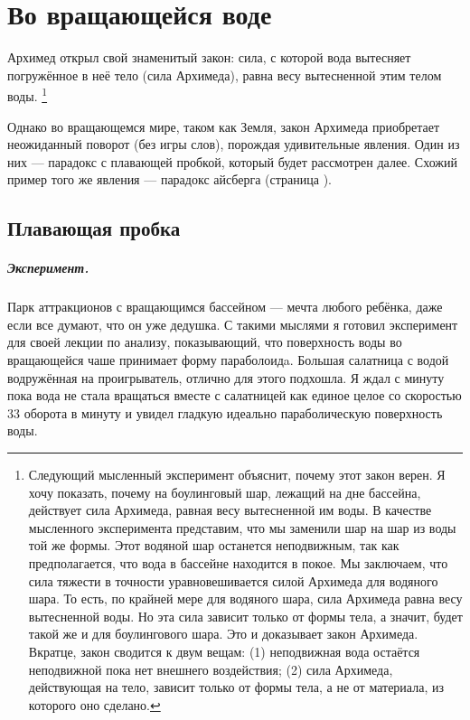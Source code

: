 \chapter{Во вращающейся воде}

Архимед открыл свой знаменитый закон: сила, с которой вода вытесняет погружённое в неё тело (сила Архимеда), равна весу вытесненной этим телом воды.%
\footnote{Следующий мысленный эксперимент объяснит, почему этот закон верен. Я хочу показать, почему на боулинговый шар, лежащий на дне бассейна, действует сила Архимеда, равная весу вытесненной им воды. В качестве мысленного эксперимента представим, что мы заменили шар на шар из воды той же формы. Этот водяной шар останется неподвижным, так как предполагается, что вода в бассейне находится в покое. Мы заключаем, что сила тяжести в точности уравновешивается силой Архимеда для водяного шара. То есть, по крайней мере для водяного шара, сила Архимеда равна весу вытесненной воды. Но эта сила зависит только от формы тела, а значит, будет такой же и для боулингового шара. Это и доказывает закон Архимеда.
Вкратце, закон сводится к двум вещам:
(1) неподвижная вода остаётся неподвижной пока нет внешнего воздействия;
(2) сила Архимеда, действующая на тело, зависит только от формы тела, а не от материала, из которого оно сделано.}

Однако во вращающемся мире, таком как Земля, закон Архимеда приобретает неожиданный поворот (без игры слов), порождая удивительные явления.
Один из них — парадокс с плавающей пробкой, который будет рассмотрен далее.
Схожий пример того же явления — парадокс айсберга (страница \pageref{sec:iceberg}).

\section{Плавающая пробка}\label{sec:cork}

\paragraph*{Эксперимент.}
Парк аттракционов с вращающимся бассейном --- мечта любого ребёнка, даже если все думают, что он уже дедушка.
С такими мыслями я готовил эксперимент для своей лекции по анализу, показывающий, что поверхность воды во вращающейся чаше принимает форму параболоидa.
Большая салатница с водой водружённая на проигрыватель, отлично для этого подхошла.
Я ждал с минуту пока вода не стала вращаться вместе с салатницей как единое целое со скоростью 33 оборота в минуту и увидел гладкую идеально параболическую поверхность воды.

